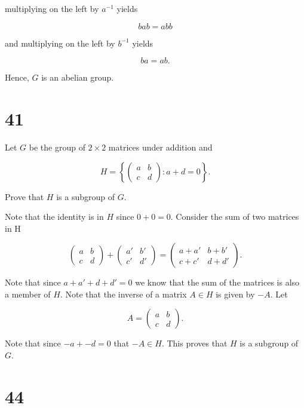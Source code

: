 \documentclass[a4paper]{article}
\begin{document}
multiplying on the left by $a^{-1}$ yields

$$bab = abb$$

and multiplying on the left by $b^{-1}$ yields

$$ba = ab.$$

Hence, $G$ is an abelian group.


\section*{41}

Let $G$ be the group of $2 \times 2$ matrices under addition and 

$$ H = \left\{
  \begin{pmatrix}
    a & b \\
    c & d
  \end{pmatrix} : a + d = 0\right\}.
$$

Prove that $H$ is a subgroup of $G$.

\vspace{\baselineskip}

Note that the identity is in $H$ since $0 + 0 = 0$. Consider the sum of two matrices in H

$$\begin{pmatrix}
    a & b \\
    c & d
  \end{pmatrix}
  +
  \begin{pmatrix}
    a' & b' \\
    c' & d'
  \end{pmatrix}
  =
  \begin{pmatrix}
    a + a' & b + b' \\
    c + c' & d + d'
  \end{pmatrix}.
$$

Note that since $a + a' + d + d' = 0$ we know that the sum of the matrices is also a member of $H$. Note that the inverse of a matrix $A \in H$ is given by $-A$. Let 

$$A = 
  \begin{pmatrix}
    a & b \\
    c & d
  \end{pmatrix}.
$$

Note that since $-a + -d = 0$ that $-A \in H$. This proves that $H$ is a subgroup of $G$.


\section*{44}
\end{document}
